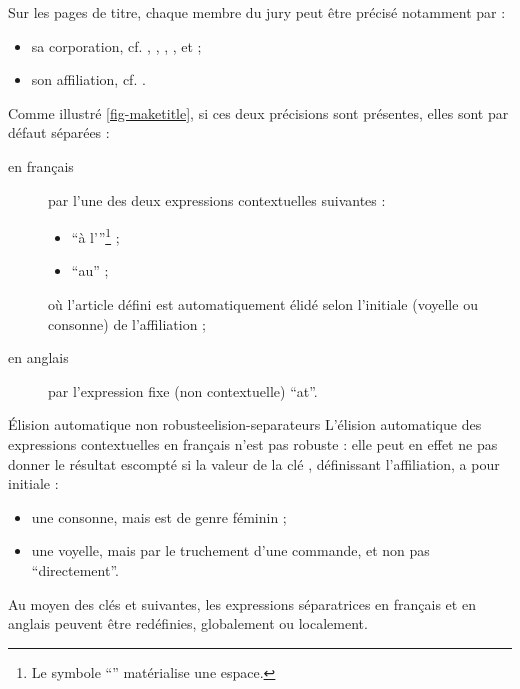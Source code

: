 Sur les pages de titre, chaque membre du jury peut être précisé notamment par :
\begin{itemize}
\item sa corporation, cf. , , ,
  ,  et
   ;
\item son affiliation, cf. .
\end{itemize}
Comme illustré \vref{fig-maketitle}, si ces deux précisions sont présentes,
elles sont par défaut séparées :
\begin{description}
\item[en français] par l'une des deux expressions contextuelles suivantes :
  \begin{itemize}
  \item \enquote{\textvisiblespace{}à l'}\footnote{Le symbole
      \enquote{\textvisiblespace{}} matérialise une espace.} ;
  \item \enquote{\textvisiblespace{}au\textvisiblespace{}} ;
  \end{itemize}
  où l'article défini est automatiquement élidé selon l'initiale (voyelle ou
  consonne) de l'affiliation ;
\item[en anglais] par l'expression fixe (non contextuelle)
  \enquote{\textvisiblespace{}at\textvisiblespace{}}.
\end{description}

\begin{dbwarning}{Élision automatique non robuste}{elision-separateurs}
  L'élision automatique des expressions contextuelles en français n'est pas
  robuste : elle peut en effet ne pas donner le résultat escompté si la valeur
  de la clé , définissant l'affiliation, a pour initiale :
  \begin{itemize}
  \item une consonne, mais est de genre féminin ;
  \item une voyelle, mais par le truchement d'une commande\commandeacronyme, et
    non pas \enquote{directement}.
  \end{itemize}
\end{dbwarning}

Au moyen des clés  et 
suivantes, les expressions séparatrices en français et en anglais peuvent être
redéfinies, globalement ou localement.

